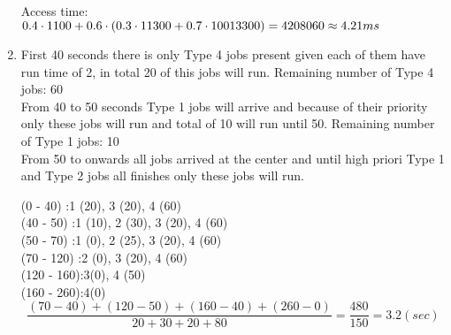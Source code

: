 \documentclass[12pt]{article}
\begin{document}
\begin{enumerate}
        Access time: $0.4 \cdot 1100 + 0.6 \cdot (0.3 \cdot 11300 + 0.7 \cdot 10013300) \\ = 4208060 \approx 4.21 ms$

        \item First 40 seconds there is only Type 4 jobs present given each of them have run time of 2, in total 20 of this jobs will run. Remaining number of Type 4 jobs: 60\\
        From 40 to 50 seconds Type 1 jobs will arrive and because of their priority only these jobs will run and total of 10 will run until 50. Remaining number of Type 1 jobs: 10\\
        From 50 to onwards all jobs arrived at the center and until high priori Type 1 and Type 2 jobs all finishes only these jobs will run. 

        (0 - 40)   \space\space:1 (20), 3 (20), 4 (60)\\
        (40 - 50)  \space:1 (10), 2 (30),  3 (20), 4 (60)\\
        (50 - 70)  \space:1 (0), 2 (25), 3 (20), 4 (60)\\ 
        (70 - 120) :2 (0), 3 (20), 4 (60)\\
        (120 - 160):3(0), 4 (50)\\
        (160 - 260):4(0)\\

        \begin{equation*}
        \frac{(70 - 40)+(120 - 50)+(160 - 40)+(260 - 0)}{20 + 30 + 20 +80} = \frac{480}{150} = 3.2 (sec)
        \end{equation*}

    \end{enumerate}
\end{document}
